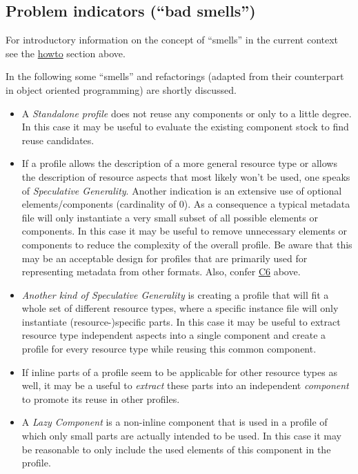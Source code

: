 \subsection{Problem indicators (``bad smells'')} \label{modelling-bad-smells}

For introductory information on the concept of ``smells'' in the current context see the \hyperref[howto]{howto} section above.

In the following some ``smells'' and refactorings (adapted from their counterpart in object oriented programming) are shortly discussed. 

\begin{itemize}
\tightlist
\item
  A \emph{Standalone profile} does not reuse any components or only to a little degree. In this case it may be useful to evaluate the existing component stock to find reuse candidates.
\item
  If a profile allows the description of a more general resource type or allows the description of resource aspects that most likely won't be used, one speaks of \emph{Speculative Generality}. Another indication
  is an extensive use of optional elements/components (cardinality of 0). As a consequence a typical metadata file will only instantiate a very small subset of all possible elements or components. In this case it may be useful to remove unnecessary elements or components to reduce the complexity of the overall profile. Be aware that this may
  be an acceptable design for profiles that are primarily used for representing metadata from other formats. Also, confer
  \hyperref[c6]{C6} above.
\item
  \emph{Another kind of Speculative Generality} is creating a profile that will fit a whole set of different resource types, where a specific instance file will only instantiate (resource-)specific parts. In this case it may be useful to extract resource type independent aspects into a single component and create a profile for every resource type while reusing this common component.
\item
  If inline parts of a profile seem to be applicable for other resource types as well, it may be a useful to \emph{extract} these parts into an independent \emph{component} to promote its reuse in other profiles.
\item
  A \emph{Lazy Component} is a non-inline component that is used in a profile of which only small parts are actually intended to be used. In this case it may be reasonable to only include the used elements of this component in the profile.

\end{itemize}
